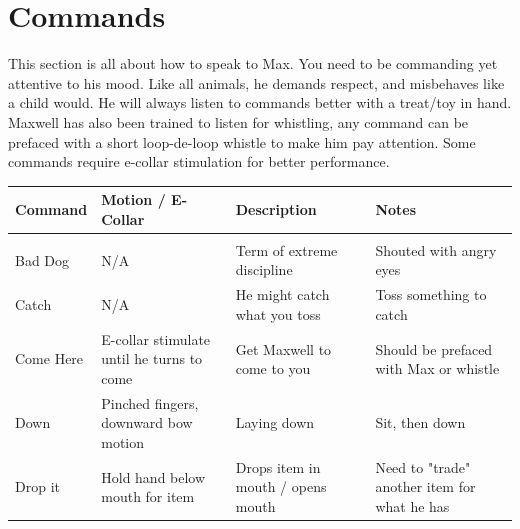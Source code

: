 \documentclass[pdftex,12pt]{article}
\begin{document}
\newpage
\section{Commands}

This section is all about how to speak to Max. You need to be commanding yet
attentive to his mood. Like all animals, he demands respect, and misbehaves like
a child would. He will always listen to commands better with a treat/toy in
hand. Maxwell has also been trained to listen for whistling, any command can be
prefaced with a short loop-de-loop whistle to make him pay attention. Some
commands require e-collar stimulation for better performance.

\begin{table}[H]
    \label{tab:commands}
    \begin{adjustwidth}{-4.5cm}{-4.5cm}
        \begin{center}
            \bgroup
            \def\arraystretch{1.3} %
            \begin{tabular}{lp{}p{}p{}}
                Command     & Motion / E-Collar                                      &
                Description                                           & Notes
                \\ \hline \\
                Bad Dog     & N/A                                              & Term of extreme discipline                            & Shouted with angry eyes                                            \\
                Catch       & N/A                                              & He might catch what you toss                          & Toss something to catch                                            \\
                Come Here   & E-collar stimulate until he turns to come
                & Get Maxwell to come to you                            &
                Should be prefaced with Max or whistle                                    \\
                Down        & Pinched fingers, downward bow motion             & Laying down                                           & Sit, then down                                                     \\
                Drop it     & Hold hand below mouth for item                   & Drops item in mouth / opens mouth                     & Need to "trade" another item for what he has                       \\

\end{tabular}
\end{center}
\end{adjustwidth}
\end{table}
\end{document}
